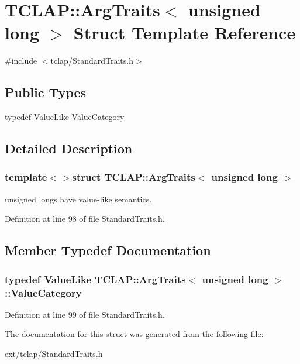 \hypertarget{struct_t_c_l_a_p_1_1_arg_traits_3_01unsigned_01long_01_4}{}\section{T\+C\+L\+A\+P\+:\+:Arg\+Traits$<$ unsigned long $>$ Struct Template Reference}
\label{struct_t_c_l_a_p_1_1_arg_traits_3_01unsigned_01long_01_4}


{\ttfamily \#include $<$tclap/\+Standard\+Traits.\+h$>$}

\subsection*{Public Types}
\begin{DoxyCompactItemize}
\item 
typedef \hyperlink{struct_t_c_l_a_p_1_1_value_like}{Value\+Like} \hyperlink{struct_t_c_l_a_p_1_1_arg_traits_3_01unsigned_01long_01_4_aa6aeb6243e6fbf8b5aba659083baa1ac}{Value\+Category}
\end{DoxyCompactItemize}


\subsection{Detailed Description}
\subsubsection*{template$<$$>$struct T\+C\+L\+A\+P\+::\+Arg\+Traits$<$ unsigned long $>$}

unsigned longs have value-\/like semantics. 

Definition at line 98 of file Standard\+Traits.\+h.



\subsection{Member Typedef Documentation}
\hypertarget{struct_t_c_l_a_p_1_1_arg_traits_3_01unsigned_01long_01_4_aa6aeb6243e6fbf8b5aba659083baa1ac}{}
\subsubsection[{Value\+Category}]{\setlength{\rightskip}{0pt plus 5cm}typedef {\bf Value\+Like} {\bf T\+C\+L\+A\+P\+::\+Arg\+Traits}$<$ unsigned long $>$\+::{\bf Value\+Category}}\label{struct_t_c_l_a_p_1_1_arg_traits_3_01unsigned_01long_01_4_aa6aeb6243e6fbf8b5aba659083baa1ac}


Definition at line 99 of file Standard\+Traits.\+h.



The documentation for this struct was generated from the following file\+:\begin{DoxyCompactItemize}
\item 
ext/tclap/\hyperlink{_standard_traits_8h}{Standard\+Traits.\+h}\end{DoxyCompactItemize}
